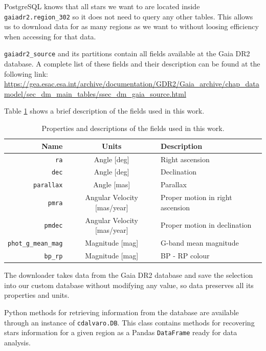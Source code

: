 \documentclass[11pt, a4paper, english]{book}
\begin{document}
PostgreSQL knows that all stars we want to are located inside \verb|gaiadr2.region_302| so it does not need to query any other tables.
This allows us to download data for as many regions as we want to without loosing efficiency when accessing for that data.

\verb|gaiadr2_source| and its partitions contain all fields available at the Gaia DR2 database.
A complete list of these fields and their description can be found at the following link:
\sloppy\url{https://gea.esac.esa.int/archive/documentation/GDR2/Gaia_archive/chap_datamodel/sec_dm_main_tables/ssec_dm_gaia_source.html}

Table \ref{tab:important_fields} shows a brief description of the fields used in this work.

\begin{table}[h!]
  \begin{center}
    \begin{tabular}{r|c|l}
      \textbf{Name} & \textbf{Units} & \textbf{Description} \\
      \hline
      \verb|ra| & Angle [deg] & Right ascension \\
      \verb|dec| & Angle [deg] & Declination \\
      \verb|parallax| & Angle [mas] & Parallax \\
      \verb|pmra| & Angular Velocity [mas/year] & Proper motion in right ascension \\
      \verb|pmdec| & Angular Velocity [mas/year] & Proper motion in declination \\
      \verb|phot_g_mean_mag| & Magnitude [mag] & G-band mean magnitude \\
      \verb|bp_rp| & Magnitude [mag] & BP - RP colour \\
    \end{tabular}
    \caption{Properties and descriptions of the fields used in this work.}
    \label{tab:important_fields}
  \end{center}
\end{table}

The downloader takes data from the Gaia DR2 database and save the selection into our custom database without modifying any value,
so data preserves all its properties and units.

Python methods for retrieving information from the database are available through an instance of \verb|cdalvaro.DB|.
This class contains methods for recovering stars information for a given region as a Pandas \verb|DataFrame| ready for data analysis.
\end{document}
